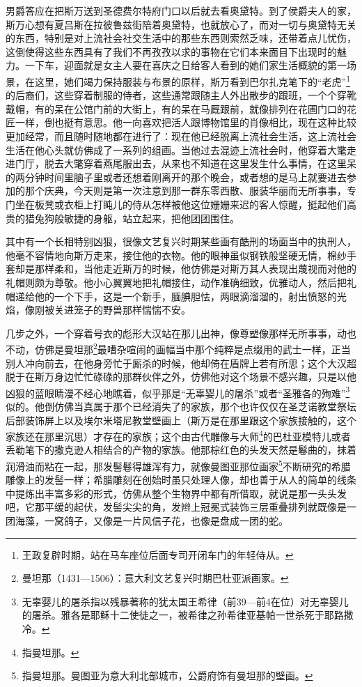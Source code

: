 \par 男爵答应在把斯万送到圣德费尔特府门口以后就去看奥黛特。到了侯爵夫人的家，斯万心想有夏吕斯在拉彼鲁兹街陪着奥黛特，也就放心了，而对一切与奥黛特无关的东西，特别是对上流社会社交生活中的那些东西则索然乏味，还带着点儿忧伤，这倒使得这些东西具有了我们不再孜孜以求的事物在它们本来面目下出现时的魅力。一下车，迎面就是女主人要在喜庆之日给客人看到的她们家生活概貌的第一场景，在这里，她们竭力保持服装与布景的原样，斯万看到巴尔扎克笔下的“老虎”\footnote{王政复辟时期，站在马车座位后面专司开闭车门的年轻侍从。}的后裔们，这些穿着制服的侍者，这些通常跟随主人外出散步的跟班，一个个穿靴戴帽，有的呆在公馆门前的大街上，有的呆在马厩跟前，就像排列在花圃门口的花匠一样，倒也挺有意思。他一向喜欢把活人跟博物馆里的肖像相比，现在这种比较更加经常，而且随时随地都在进行了：现在他已经脱离上流社会生活，这上流社会生活在他心头就仿佛成了一系列的组画。当他过去混迹上流社会时，他穿着大氅走进门厅，脱去大氅穿着燕尾服出去，从来也不知道在这里发生什么事情，在这里呆的两分钟时间里脑子里或者还想着刚离开的那个晚会，或者想的是马上就要进去参加的那个庆典，今天则是第一次注意到那一群东零西散、服装华丽而无所事事，专门坐在板凳或衣柜上打盹儿的侍从怎样被他这位姗姗来迟的客人惊醒，挺起他们高贵的猎兔狗般敏捷的身躯，站立起来，把他团团围住。
\par 其中有一个长相特别凶狠，很像文艺复兴时期某些画有酷刑的场面当中的执刑人，他毫不容情地向斯万走来，接住他的衣物。他的眼神虽似钢铁般坚硬无情，棉纱手套却是那样柔和，当他走近斯万的时候，他仿佛是对斯万其人表现出蔑视而对他的礼帽则颇为尊敬。他小心翼翼地把礼帽接住，动作准确细致，优雅动人，然后把礼帽递给他的一个下手，这是一个新手，腼腆胆怯，两眼滴溜溜的，射出愤怒的光焰，像刚被关进笼子的野兽那样惴惴不安。
\par 几步之外，一个穿着号衣的彪形大汉站在那儿出神，像尊塑像那样无所事事，动也不动，仿佛是曼坦那\footnote{曼坦那（1431—1506）：意大利文艺复兴时期巴杜亚派画家。}最嘈杂喧闹的画幅当中那个纯粹是点缀用的武士一样，正当别人冲向前去，在他身旁忙于厮杀的时候，他却倚在盾牌上若有所思；这个大汉超脱于在斯万身边忙忙碌碌的那群伙伴之外，仿佛他对这个场景不感兴趣，只是以他凶狠的蓝眼睛漫不经心地瞧着，似乎那是“无辜婴儿的屠杀”或者“圣雅各的殉难”\footnote{无辜婴儿的屠杀指以残暴著称的犹太国王希律（前39—前4在位）对无辜婴儿的屠杀。雅各是耶稣十二使徒之一，被希律之孙希律亚基帕一世杀死于耶路撒冷。}似的。他倒仿佛当真属于那个已经消失了的家族，那个也许仅仅在圣芝诺教堂祭坛后部装饰屏上以及埃尔米塔尼教堂壁画上（斯万是在那里跟这个家族接触的，这个家族还在那里沉思）才存在的家族；这个由古代雕像与大师\footnote{指曼坦那。}的巴杜亚模特儿或者丢勒笔下的撒克逊人相结合的产物的家族。他那棕红色的头发天然是鬈曲的，抹着润滑油而粘在一起，那发髻鬈得雄浑有力，就像曼图亚那位画家\footnote{指曼坦那。曼图亚为意大利北部城市，公爵府饰有曼坦那的壁画。}不断研究的希腊雕像上的发髻一样；希腊雕刻在创始时虽只处理人像，却也善于从人的简单的线条中提炼出丰富多彩的形式，仿佛从整个生物界中都有所借取，就说是那一头头发吧，它那平缓的起伏，发髻尖尖的角，发辫上冠冕式装饰三层重叠排列就既像是一团海藻，一窝鸽子，又像是一片风信子花，也像是盘成一团的蛇。
